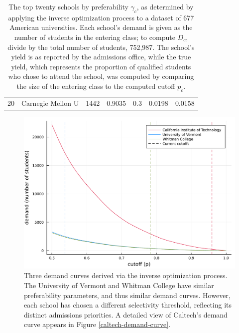 \documentclass[12pt]{article}
\theoremstyle{definition}
\begin{document}
\begin{table}[]
\begin{tabular}{r|l|r|l|l|l|l}
20                                 & Carnegie Mellon U                     & 1442                                 & 0.9035                  & 0.3            & 0.0198              & 0.0158                             
\end{tabular}
\caption{\label{tab:US-inverse-optimization}
The top twenty schools by preferability $\gamma_c$, as determined by applying the inverse optimization process to a dataset of 677 American universities. Each school's demand is given as the number of students in the entering class; to compute $D_c$, divide by the total number of students, 752,987. The school's yield is as reported by the admissions office, while the true yield, which represents the proportion of qualified students who chose to attend the school, was computed by comparing the size of the entering class to the computed cutoff $p_c$.}
\end{table}





\begin{figure}
\begin{center}\includegraphics[width=\linewidth, ]{plots/three-demand-curves.pdf}\end{center}
\captionsetup{singlelinecheck=off}
    \caption[.]{Three demand curves derived via the inverse optimization process. The University of Vermont and Whitman College have similar preferability parameters, and thus similar demand curves. However, each school has chosen a different selectivity threshold, reflecting its distinct admissions priorities. A detailed view of Caltech's demand curve appears in Figure \ref{caltech-demand-curve}.}
\label{three-demand-curves}
\end{figure}
\end{document}
